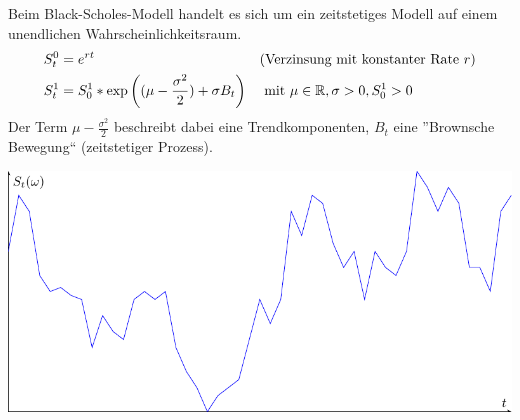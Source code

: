 \begin{beispiel}
	Beim Black-Scholes-Modell handelt es sich um ein zeitstetiges Modell auf einem unendlichen Wahrscheinlichkeitsraum.
	\begin{equation*}
		\begin{aligned}
		S_t^0 &= e^{rt} && (\text{Verzinsung mit konstanter Rate } r) \\
		S_t^1 &= S_0^1 * \exp\left( (\mu-\frac{\sigma^2}{2}) + \sigma B_t \right) &&\text{ mit } \mu \in \mathbb{R}, \sigma > 0, S_0^1 > 0
		\end{aligned}
	\end{equation*}
	Der Term $\mu-\frac{\sigma^2}{2}$ beschreibt dabei eine Trendkomponenten, $B_t$ eine ''Brownsche Bewegung`` (zeitstetiger Prozess).
	\begin{center}
		\includegraphics[width=.5\textwidth]{./stochv_abbildungen/stochv_1_2_bsm}
	\end{center}
\end{beispiel}


